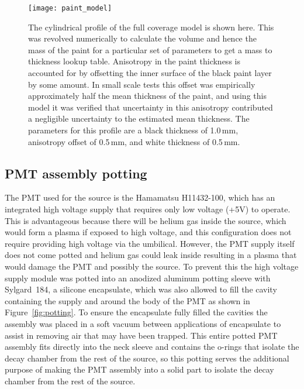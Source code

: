\begin{figure}[h!]
\centering
\texttt{[image: paint\_model]}
\caption{The cylindrical profile of the full coverage model is shown here. This was revolved numerically to calculate the volume and hence the mass of the paint for a particular set of parameters to get a mass to thickness lookup table. Anisotropy in the paint thickness is accounted for by offsetting the inner surface of the black paint layer by some amount. In small scale tests this offset was empirically approximately half the mean thickness of the paint, and using this model it was verified that uncertainty in this anisotropy contributed a negligible uncertainty to the estimated mean thickness. The parameters for this profile are a black thickness of 1.0\,mm, anisotropy offset of 0.5\,mm, and white thickness of 0.5\,mm. }
\label{fig:surfacemodel}
\end{figure}

\subsection{PMT assembly potting}
The PMT used for the source is the Hamamatsu H11432-100, which has an integrated high voltage supply that requires only low voltage (+5V) to operate. This is advantageous because there will be helium gas inside the source, which would form a plasma if exposed to high voltage, and this configuration does not require providing high voltage via the umbilical. However, the PMT supply itself does not come potted and helium gas could leak inside resulting in a plasma that would damage the PMT and possibly the source. To prevent this the high voltage supply module was potted into an anodized aluminum potting sleeve with Sylgard~184, a silicone encapsulate, which was also allowed to fill the cavity containing the supply and around the body of the PMT as shown in Figure~\ref{fig:potting}. To ensure the encapsulate fully filled the cavities the assembly was placed in a soft vacuum between applications of encapsulate to assist in removing air that may have been trapped. This entire potted PMT assembly fits directly into the neck sleeve and contains the o-rings that isolate the decay chamber from the rest of the source, so this potting serves the additional purpose of making the PMT assembly into a solid part to isolate the decay chamber from the rest of the source. 


